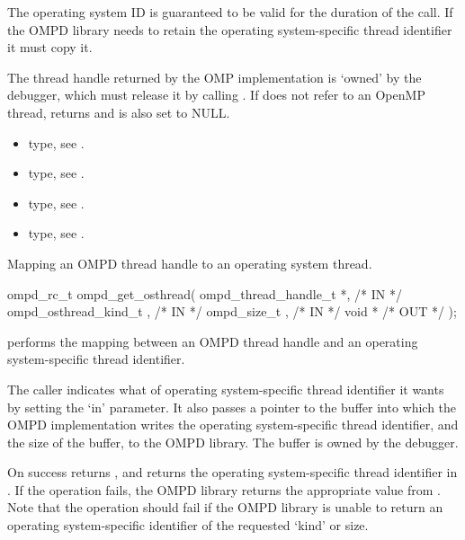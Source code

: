\argdesc

The operating system ID  is guaranteed
to be valid for the duration of the call.
If the OMPD library needs to retain the operating system-specific
thread identifier it must copy it.

The thread handle  returned by the OMP implementation
is `owned' by the debugger, which must release it by calling
.
If  does not refer to an OpenMP thread,
 returns 
and  is also set to NULL.
\crossreferences
\begin{itemize}
	\item {} type, see .
	\item {} type, see .
	\item {} type, see .
	\item {} type, see .
\end{itemize}

\summary
Mapping an OMPD thread handle to an operating system thread.
\format
\cspecificstart
\begin{boxedcode}
ompd\_rc\_t ompd\_get\_osthread(
  ompd\_thread\_handle\_t *,                             /* IN */
  ompd\_osthread\_kind\_t ,                                      /* IN */
  ompd\_size\_t ,                           /* IN */
  void  *                                  /* OUT */
);
\end{boxedcode}
\cspecificend

\descr
{} performs the mapping between an OMPD
thread handle and an operating system-specific thread identifier.

\argdesc
The caller indicates what  of operating system-specific thread
identifier it wants by setting the 
`in' parameter.
It also passes a pointer to the buffer into which the OMPD
implementation writes the operating system-specific thread identifier,
and the size of the buffer, to the OMPD library.
The buffer is owned by the debugger.

On success  returns ,
and returns the operating system-specific thread identifier in
.
If the operation fails, the OMPD library returns
the appropriate value from .
Note that the operation should fail if the OMPD library is
unable to return an operating system-specific identifier of the
requested `kind' or size.

